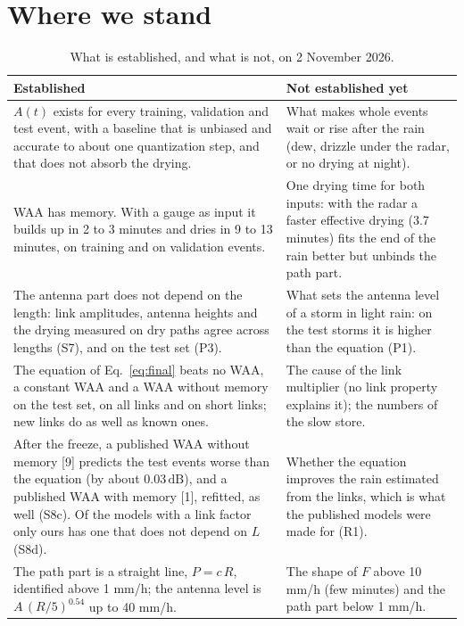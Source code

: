\documentclass[11pt,a4paper]{article}
\newcommand{\dB}{\,\mathrm{dB}}
\begin{document}
\section{Where we stand}
\label{sec:stand}

\begin{table}[H]
\centering
\caption{What is established, and what is not, on 2 November 2026.}
\label{tab:stand}
\small
\begin{tabularx}{\linewidth}{@{}Y Y@{}}
\toprule
\textbf{Established} & \textbf{Not established yet} \\
\midrule
$A(t)$ exists for every training, validation and test event, with a baseline that is unbiased and accurate to about one quantization step, and that does not absorb the drying. &
What makes whole events wait or rise after the rain (dew, drizzle under the radar, or no drying at night). \\
WAA has memory. With a gauge as input it builds up in 2 to 3 minutes and dries in 9 to 13 minutes, on training and on validation events. &
One drying time for both inputs: with the radar a faster effective drying (3.7 minutes) fits the end of the rain better but unbinds the path part. \\
The antenna part does not depend on the length: link amplitudes, antenna heights and the drying measured on dry paths agree across lengths (S7), and on the test set (P3). &
What sets the antenna level of a storm in light rain: on the test storms it is higher than the equation (P1). \\
The equation of Eq.~\eqref{eq:final} beats no WAA, a constant WAA and a WAA without memory on the test set, on all links and on short links; new links do as well as known ones. &
The cause of the link multiplier (no link property explains it); the numbers of the slow store. \\
After the freeze, a published WAA without memory [9] predicts the test events worse than the equation (by about 0.03$\dB$), and a published WAA with memory [1], refitted, as well (S8c). Of the models with a link factor only ours has one that does not depend on $L$ (S8d). &
Whether the equation improves the rain estimated from the links, which is what the published models were made for (R1). \\
The path part is a straight line, $P = c\,R$, identified above 1 mm/h; the antenna level is $A\,(R/5)^{0.54}$ up to 40 mm/h. &
The shape of $F$ above 10 mm/h (few minutes) and the path part below 1 mm/h. \\

\end{tabularx}
\end{table}
\end{document}
